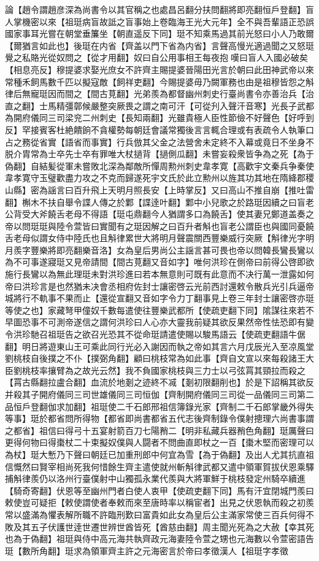 論【趙令謂趙彦深為尚書令以其官稱之也處昌呂翻分扶問翻將即亮翻恒戶登翻】盲人掌機密以來【祖珽病盲故詆之盲事始上卷臨海王光大元年】全不與吾輩語正恐誤國家事耳光嘗在朝堂垂簾坐【朝直遥反下同】珽不知乘馬過其前光怒曰小人乃敢爾【爾猶言如此也】後珽在内省【齊盖以門下省為内省】言聲高慢光適過聞之又怒珽覺之私賂光從奴問之【從才用翻】奴曰自公用事相王每夜抱嘆曰盲人入國必破矣【相息亮反】穆提婆求娶光庶女不許齊主賜提婆晉陽田光言於朝曰此田神武帝以來常種禾飼馬數千匹以擬寇敵【飼祥吏翻】今賜提婆毋乃闕軍務也由是祖穆皆怨之斛律后無寵珽因而間之【間古莧翻】光弟羨為都督幽州刺史行臺尚書令亦善治兵【治直之翻】士馬精彊鄣候嚴整突厥畏之謂之南可汗【可從刋入聲汗音寒】光長子武都為開府儀同三司梁兖二州刺史【長知兩翻】光雖貴極人臣性節儉不好聲色【好呼到反】罕接賓客杜絶饋餉不貪權勢每朝廷會議常獨後言言輒合理或有表疏令人執筆口占之務從省實【語省而事實】行兵倣其父金之法營舍未定終不入幕或竟日不坐身不脱介胄常為士卒先士卒有罪唯大杖撾背【撾側瓜翻】未嘗妄殺衆皆争為之死【為于偽翻】自結髪從軍未嘗敗北深為鄰敵所憚周勲州刺史韋孝寛【高歡宇文秦兵争秦使韋孝寛守玉璧歡盡力攻之不克而歸遂死宇文氏於此立勲州以旌其功其地在隋絳郡稷山縣】密為謡言曰百升飛上天明月照長安【上時掌反】又曰高山不推自崩【推吐雷翻】槲木不扶自舉令諜人傳之於鄴【諜逹叶翻】鄴中小兒歌之於路珽因續之曰盲老公背受大斧饒舌老母不得語【珽屯鼎翻今人猶謂多口為饒舌】使其妻兄鄭道盖奏之帝以問珽珽與陸令萱皆曰實聞有之珽因解之曰百升者斛也盲老公謂臣也與國同憂饒舌老母似謂女侍中陸氏也且斛律累世大將明月聲震關西豐樂威行突厥【斛律光字明月羨字豐樂將即亮翻樂音洛】女為皇后男尚公主謡言甚可畏也帝以問韓長鸞長鸞以為不可事遂寢珽又見帝請間【間古莧翻又音如字】唯何洪珍在側帝曰前得公啓即欲施行長鸞以為無此理珽未對洪珍進曰若本無意則可既有此意而不决行萬一泄露如何帝曰洪珍言是也然猶未决會丞相府佐封士讓密啓云光前西討還敕令散兵光引兵逼帝城將行不軌事不果而止【還從宣翻又音如字令力丁翻事見上卷三年封士讓密啓亦珽等使之也】家藏弩甲僮奴千數每遣使往豐樂武都所【使疏吏翻下同】隂謀往來若不早圖恐事不可測帝遂信之謂何洪珍曰人心亦大靈我前疑其欲反果然帝性怯恐即有變令洪珍馳召祖珽告之欲召光恐其不從命珽請遣使賜以駿馬語云【使疏吏翻語牛倨翻】明日將遊東山王可乘此同行光必入謝因而執之帝如其言六月戊辰光入至凉風堂劉桃枝自後撲之不仆【撲弼角翻】顧曰桃枝常為如此事【齊自文宣以來每殺諸王大臣劉桃枝率攘臂為之故光云然】我不負國家桃枝與三力士以弓弦罥其頸拉而殺之【罥古縣翻拉盧合翻】血流於地剗之迹終不㓕【剗初限翻削也】於是下詔稱其欲反并殺其子開府儀同三司世雄儀同三司恒伽【齊制開府儀同三司從一品儀同三司第二品恒戶登翻伽求加翻】祖珽使二千石郎邢祖信簿錄光家【齊制二千石郎掌畿外得失等事】珽於都省問所得物【都省即尚書都省五代志後齊制錄令僕射摠理六尚書事謂之都省】祖信曰得弓十五宴射箭百刀七陽矟二【明非私藏兵器矟色角翻】珽厲聲曰更得何物曰得棗杖二十束擬奴僕與人闘者不問曲直即杖之一百【棗木堅而密理可以為杖】珽大慙乃下聲曰朝廷已加重刑郎中何宜為雪【為于偽翻】及出人尤其抗直祖信慨然曰賢宰相尚死我何惜餘生齊主遣使就州斬斛律武都又遣中領軍賀拔伏恩乘驛捕斛律羨仍以洛州行臺僕射中山獨孤永業代羨與大將軍鮮于桃枝發定州騎卒續進【騎奇寄翻】伏恩等至幽州門者白使人衷甲【使疏吏翻下同】馬有汗宜閉城門羨曰敕使豈可疑拒【敕使謂使者奉敕而來至唐時率以稱宦者】出見之伏恩執而殺之初羨常以盛滿為懼表解所職不許臨刑歎曰富貴如此女為皇后公主滿家常使三百兵何得不敗及其五子伏護世逹世遷世辨世酋皆死【酋慈由翻】周主聞光死為之大赦【幸其死也為于偽翻】祖珽與侍中高元海共執齊政元海妻陸令萱之甥也元海數以令萱密語告珽【數所角翻】珽求為領軍齊主許之元海密言於帝曰孝徵漢人【祖珽字孝徵